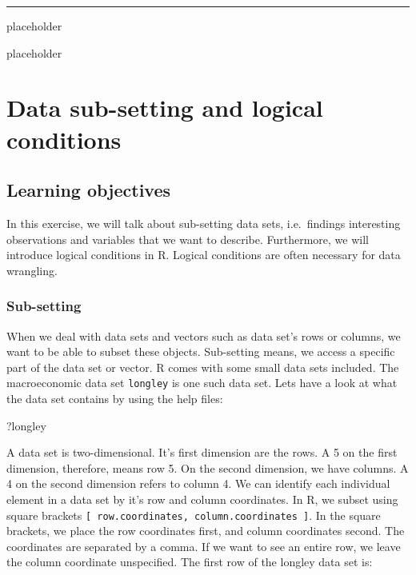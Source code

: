 \documentclass[]{article}
\newenvironment{Shaded}{\begin{snugshade}}{\end{snugshade}}
\newcommand{\NormalTok}[1]{#1}
\begin{document}
\begin{center}\rule{0.5\linewidth}{\linethickness}\end{center}

placeholder

placeholder

\hypertarget{data-sub-setting-and-logical-conditions}{%
\section{Data sub-setting and logical conditions}\label{data-sub-setting-and-logical-conditions}}

\hypertarget{learning-objectives}{%
\subsection{Learning objectives}\label{learning-objectives}}

In this exercise, we will talk about sub-setting data sets, i.e.~findings interesting observations and variables that we want to describe. Furthermore, we will introduce logical conditions in R. Logical conditions are often necessary for data wrangling.

\hypertarget{sub-setting}{%
\subsubsection{Sub-setting}\label{sub-setting}}

When we deal with data sets and vectors such as data set's rows or columns, we want to be able to subset these objects. Sub-setting means, we access a specific part of the data set or vector. R comes with some small data sets included. The macroeconomic data set \texttt{longley} is one such data set. Lets have a look at what the data set contains by using the help files:

\begin{Shaded}
\begin{Highlighting}[]
\NormalTok{?longley}
\end{Highlighting}
\end{Shaded}

A data set is two-dimensional. It's first dimension are the rows. A 5 on the first dimension, therefore, means row 5. On the second dimension, we have columns. A 4 on the second dimension refers to column 4. We can identify each individual element in a data set by it's row and column coordinates. In R, we subset using square brackets \texttt{{[}\ row.coordinates,\ column.coordinates\ {]}}. In the square brackets, we place the row coordinates first, and column coordinates second. The coordinates are separated by a comma. If we want to see an entire row, we leave the column coordinate unspecified. The first row of the longley data set is:
\end{document}
